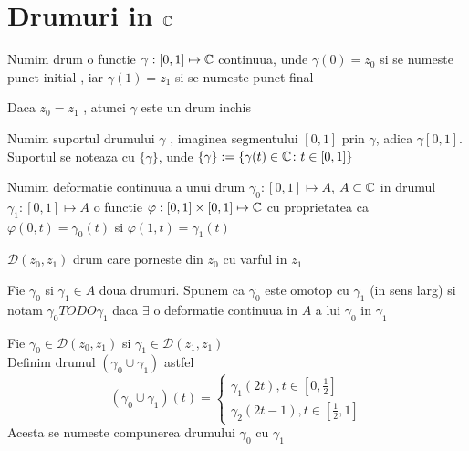 \section{Drumuri in $\mathbb{C}$}

\begin{definition}
    Numim drum o functie $\gamma : [0,1] \mapsto \mathbb{C}$ continuua,
    unde $\gamma(0)=z_0$ si se numeste punct initial ,
    iar $\gamma(1)=z_1$ si se numeste punct final
\end{definition}

\begin{observation}
    Daca $z_0=z_1$ , atunci $\gamma$ este un drum inchis
\end{observation}

\begin{definition}
    Numim suportul drumului $\gamma$ , imaginea segmentului $[0,1]$ prin $\gamma$,
    adica $\gamma[0,1]$. Suportul se noteaza cu $\{\gamma\}$, unde
    $\{\gamma\} := \{\gamma(t) \in \mathbb{C} \colon t\in [0,1]\}$
\end{definition}

\begin{definition}
    Numim deformatie continuua a unui drum $\gamma_0:[0,1]\mapsto A$, $A\subset\mathbb{C}$
    in drumul $\gamma_1:[0,1]\mapsto A$ o functie $\varphi:[0,1]\times[0,1]\mapsto \mathbb{C}$
    cu proprietatea ca $\varphi(0, t) = \gamma_0(t)$ si $\varphi(1, t)=\gamma_1(t)$
\end{definition}

\begin{notation}
    $\mathcal{D}(z_0,z_1)$ drum care porneste din $z_0$ cu varful in $z_1$
\end{notation}

\begin{definition}
    Fie $\gamma_0$ si $\gamma_1 \in A$ doua drumuri. Spunem ca $\gamma_0$ este omotop
    cu $\gamma_1$ (in sens larg) si notam $\gamma_0 TODO \gamma_1$ daca $\exists$ o
    deformatie continuua in $A$ a lui $\gamma_0$ in $\gamma_1$
\end{definition}

\begin{definition}
    Fie $\gamma_0 \in \mathcal{D}(z_0, z_1)$ si $\gamma_1 \in \mathcal{D}(z_1, z_1)$ \\
    Definim drumul $(\gamma_0 \cup \gamma_1)$ astfel
    \[
        (\gamma_0 \cup \gamma_1)(t) =
        \left \{
		    \begin{aligned}
                \gamma_1(2t), t \in \left[0,\frac{1}{2}\right] \\
                \gamma_2(2t-1), t \in \left[\frac{1}{2},1\right]
	       	\end{aligned}
        \right .
    \]
    Acesta se numeste compunerea drumului $\gamma_0$ cu $\gamma_1$
\end{definition}


